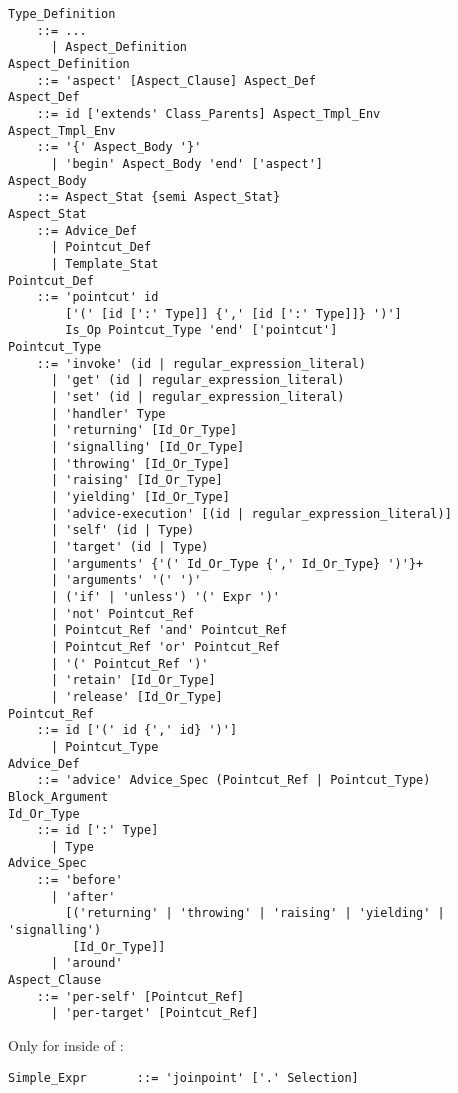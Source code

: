 \grammar\begin{lstlisting}
Type_Definition 
    ::= ...
      | Aspect_Definition
Aspect_Definition 
    ::= 'aspect' [Aspect_Clause] Aspect_Def
Aspect_Def
    ::= id ['extends' Class_Parents] Aspect_Tmpl_Env
Aspect_Tmpl_Env 
    ::= '{' Aspect_Body '}'
      | 'begin' Aspect_Body 'end' ['aspect']
Aspect_Body
    ::= Aspect_Stat {semi Aspect_Stat}
Aspect_Stat 
    ::= Advice_Def
      | Pointcut_Def
      | Template_Stat
Pointcut_Def 
    ::= 'pointcut' id
        ['(' [id [':' Type]] {',' [id [':' Type]]} ')']
        Is_Op Pointcut_Type 'end' ['pointcut']
Pointcut_Type 
    ::= 'invoke' (id | regular_expression_literal)
      | 'get' (id | regular_expression_literal)
      | 'set' (id | regular_expression_literal)
      | 'handler' Type
      | 'returning' [Id_Or_Type]
      | 'signalling' [Id_Or_Type]
      | 'throwing' [Id_Or_Type]
      | 'raising' [Id_Or_Type]
      | 'yielding' [Id_Or_Type]
      | 'advice-execution' [(id | regular_expression_literal)]
      | 'self' (id | Type)
      | 'target' (id | Type)
      | 'arguments' {'(' Id_Or_Type {',' Id_Or_Type} ')'}+
      | 'arguments' '(' ')'
      | ('if' | 'unless') '(' Expr ')'
      | 'not' Pointcut_Ref
      | Pointcut_Ref 'and' Pointcut_Ref
      | Pointcut_Ref 'or' Pointcut_Ref
      | '(' Pointcut_Ref ')'
      | 'retain' [Id_Or_Type]
      | 'release' [Id_Or_Type]
Pointcut_Ref 
    ::= id ['(' id {',' id} ')'] 
      | Pointcut_Type
Advice_Def 
    ::= 'advice' Advice_Spec (Pointcut_Ref | Pointcut_Type) Block_Argument
Id_Or_Type
    ::= id [':' Type] 
      | Type
Advice_Spec 
    ::= 'before' 
      | 'after' 
        [('returning' | 'throwing' | 'raising' | 'yielding' | 'signalling') 
         [Id_Or_Type]]
      | 'around'
Aspect_Clause
    ::= 'per-self' [Pointcut_Ref] 
      | 'per-target' [Pointcut_Ref] 
\end{lstlisting}

Only for  inside of :
\begin{lstlisting}
Simple_Expr       ::= 'joinpoint' ['.' Selection]
\end{lstlisting}








